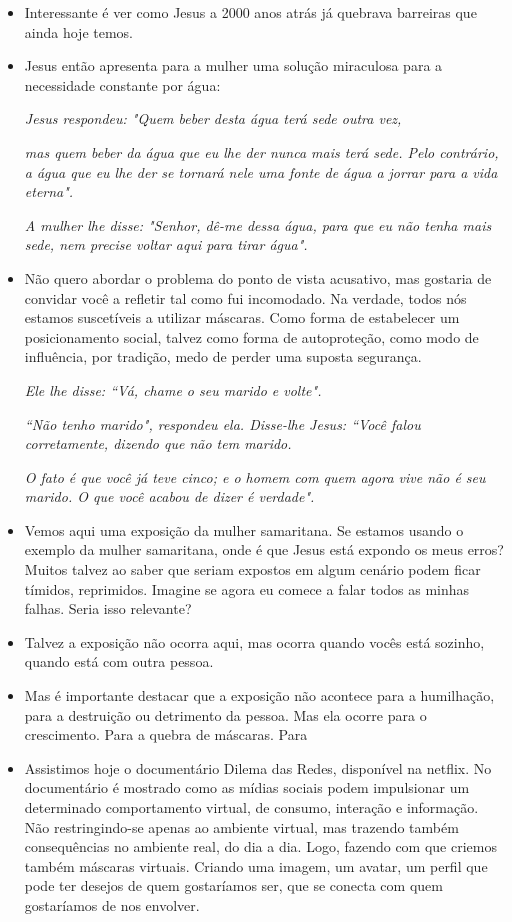 \documentclass[12pt, legalpaper]{article}
\begin{document}
\begin{itemize}
   \item Interessante é ver como Jesus a 2000 anos atrás já quebrava barreiras que ainda hoje temos.
   
   \item Jesus então apresenta para a mulher uma solução miraculosa para a necessidade constante por água:

   \emph{Jesus respondeu: "Quem beber desta água terá sede outra vez,}

   \emph{mas quem beber da água que eu lhe der nunca mais terá sede. Pelo contrário, a água que eu lhe der se tornará nele uma fonte de água a jorrar para a vida eterna".}

   \emph{A mulher lhe disse: "Senhor, dê-me dessa água, para que eu não tenha mais sede, nem precise voltar aqui para tirar água".}

   \item Não quero abordar o problema do ponto de vista acusativo, mas gostaria de convidar você a refletir tal como fui incomodado. Na verdade, todos nós estamos suscetíveis a utilizar máscaras. Como forma de estabelecer um posicionamento social, talvez como forma de autoproteção, como modo de influência, por tradição, medo de perder uma suposta segurança.
   
   \emph{Ele lhe disse: ``Vá, chame o seu marido e volte".}

   \emph{``Não tenho marido", respondeu ela. Disse-lhe Jesus: ``Você falou corretamente, dizendo que não tem marido.}


   \emph{O fato é que você já teve cinco; e o homem com quem agora vive não é seu marido. O que você acabou de dizer é verdade".}
   \item Vemos aqui uma exposição da mulher samaritana. Se estamos usando o exemplo da mulher samaritana, onde é que Jesus está expondo os meus erros? Muitos talvez ao saber que seriam expostos em algum cenário podem ficar tímidos, reprimidos. Imagine se agora eu comece a falar todos as minhas falhas. Seria isso relevante?

\newpage
   \item Talvez a exposição não ocorra aqui, mas ocorra quando vocês está sozinho, quando está com outra pessoa.
   
   \item Mas é importante destacar que a exposição não acontece para a humilhação, para a destruição ou detrimento da pessoa. Mas ela ocorre para o crescimento. Para a quebra de máscaras. Para 

   \item Assistimos hoje o documentário Dilema das Redes, disponível na netflix. No documentário é mostrado como as mídias sociais podem impulsionar um determinado comportamento virtual, de consumo, interação e informação. Não restringindo-se apenas ao ambiente virtual, mas trazendo também consequências no ambiente real, do dia a dia. Logo, fazendo com que criemos também máscaras virtuais. Criando uma imagem, um avatar, um perfil que pode ter desejos de quem gostaríamos ser, que se conecta com quem gostaríamos de nos envolver. 



\end{itemize}
\end{document}
